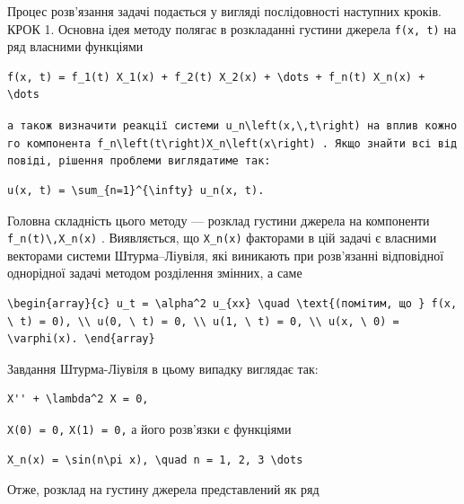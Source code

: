 \documentclass[
  ukrainian,
]{article}
\begin{document}
Процес розв'язання задачі подається у вигляді послідовності наступних
кроків. КРОК 1. Основна ідея методу полягає в розкладанні густини
джерела \texttt{f(x,\ t)} на ряд власними функціями

\begin{verbatim}
f(x, t) = f_1(t) X_1(x) + f_2(t) X_2(x) + \dots + f_n(t) X_n(x) + \dots
\end{verbatim}

\texttt{а\ також\ визначити\ реакції\ системи\ \textquotesingle{}u\_n\textbackslash{}left(x,\textbackslash{},t\textbackslash{}right)\textquotesingle{}\ на\ вплив\ кожного\ компонента\ \textquotesingle{}f\_n\textbackslash{}left(t\textbackslash{}right)X\_n\textbackslash{}left(x\textbackslash{}right)\textquotesingle{}\ .\ Якщо\ знайти\ всі\ відповіді,\ рішення\ проблеми\ виглядатиме\ так:}

\begin{verbatim}
u(x, t) = \sum_{n=1}^{\infty} u_n(x, t).
\end{verbatim}

Головна складність цього методу --- розклад густини джерела на
компоненти \texttt{f\_n(t)\textbackslash{},X\_n(x)} . Виявляється, що
\texttt{X\_n(x)} факторами в цій задачі є власними векторами системи
Штурма--Ліувіля, які виникають при розв'язанні відповідної однорідної
задачі методом розділення змінних, а саме

\begin{verbatim}
\begin{array}{c} u_t = \alpha^2 u_{xx} \quad \text{(помітим, що } f(x, \ t) = 0), \\ u(0, \ t) = 0, \\ u(1, \ t) = 0, \\ u(x, \ 0) = \varphi(x). \end{array}
\end{verbatim}

Завдання Штурма-Ліувіля в цьому випадку виглядає так:

\begin{verbatim}
X'' + \lambda^2 X = 0,
\end{verbatim}

\texttt{X(0)\ =\ 0,} \texttt{X(1)\ =\ 0,} а його розв'язки є функціями

\begin{verbatim}
X_n(x) = \sin(n\pi x), \quad n = 1, 2, 3 \dots
\end{verbatim}

Отже, розклад на густину джерела представлений як ряд
\end{document}
